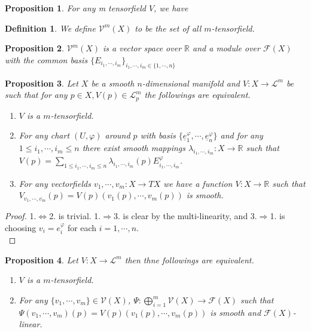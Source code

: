 \documentclass{article}
\newtheorem{proposition}{Proposition}[section]
\newtheorem{definition}{Definition}[section]
\numberwithin{equation}{section}
\begin{document}
\begin{proposition}
For any m tensorfield $V$, we have
\end{proposition}

\begin{definition}
We define $\mathcal{V}^m(X)$ to be the set of all $m$-tensorfield.
\end{definition}

\begin{proposition}
$\mathcal{V}^m(X)$ is a vector space over $\mathbb{R}$ and a module over $\mathcal{F}(X)$ with the common basis $\{E_{i_1,\cdots,i_m}\}_{i_1,\cdots,i_m\in\{1,\cdots,n\}}$
\end{proposition}

\begin{proposition}
Let $X$ be a smooth $n$-dimensional manifold and $V:X\to\mathcal{L}^m$ be such that for any $p\in X, V(p)\in\mathcal{L}_p^m$ the followings are equivalent.
\begin{enumerate}
\item $V$ is a $m$-tensorfield.
\item For any chart $(U,\varphi)$ around $p$ with basis $\{\underline{e}_1^\varphi,\cdots,\underline{e}_n^\varphi\}$ and for any $1\leq i_1,\cdots,i_m\leq n$ there exist smooth mappings $\lambda_{i_1,\cdots,i_m}:X\to\mathbb{R}$ such that $V(p)=\sum_{1\leq i_1,\cdots,i_m\leq n} \lambda_{i_1,\cdots,i_m}(p)E_{i_1,\cdots,i_m}^\varphi$. 
\item For any vectorfields $v_1,\cdots,v_m:X\to TX$ we have a function $V:X\to\mathbb{R}$ such that $V_{v_1,\cdots,v_m}(p)=V(p)(v_1(p),\cdots,v_m(p))$ is smooth.
\end{enumerate}
\end{proposition}

\begin{proof}
1.$\Leftrightarrow$2. is trivial. 1.$\Rightarrow$3. is clear by the multi-linearity, and 3.$\Rightarrow$1. is choosing $v_i=e_i^\varphi$ for each $i=1,\cdots,n$.\\
\end{proof}
\begin{proposition}
Let $V:X\to\mathcal{L}^m$ then thne followings are equivalent. 
\begin{enumerate}
\item $V$ is a $m$-tensorfield.
\item For any $\{v_1,\cdots,v_m\}\in\mathcal{V}(X)$, $\Psi:\bigoplus_{i=1}^m\mathcal{V}(X)\to\mathcal{F}(X)$ such that $\Psi(v_1,\cdots,v_m)(p)=V(p)(v_1(p),\cdots,v_m(p))$ is smooth and $\mathcal{F}(X)$-linear.
\end{enumerate}
\end{proposition}
\end{document}
